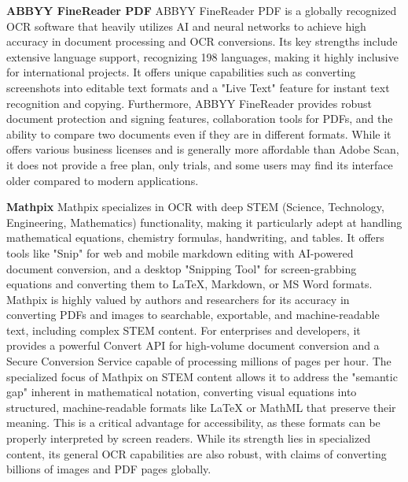 \textbf{ABBYY FineReader PDF}
ABBYY FineReader PDF is a globally recognized OCR software that heavily utilizes AI and neural networks to achieve high accuracy in document processing and OCR conversions. Its key strengths include extensive language support, recognizing 198 languages, making it highly inclusive for international projects. It offers unique capabilities such as converting screenshots into editable text formats and a "Live Text" feature for instant text recognition and copying. Furthermore, ABBYY FineReader provides robust document protection and signing features, collaboration tools for PDFs, and the ability to compare two documents even if they are in different formats. While it offers various business licenses and is generally more affordable than Adobe Scan, it does not provide a free plan, only trials, and some users may find its interface older compared to modern applications.

\textbf{Mathpix}
Mathpix specializes in OCR with deep STEM (Science, Technology, Engineering, Mathematics) functionality, making it particularly adept at handling mathematical equations, chemistry formulas, handwriting, and tables. It offers tools like "Snip" for web and mobile markdown editing with AI-powered document conversion, and a desktop "Snipping Tool" for screen-grabbing equations and converting them to LaTeX, Markdown, or MS Word formats. Mathpix is highly valued by authors and researchers for its accuracy in converting PDFs and images to searchable, exportable, and machine-readable text, including complex STEM content. For enterprises and developers, it provides a powerful Convert API for high-volume document conversion and a Secure Conversion Service capable of processing millions of pages per hour. The specialized focus of Mathpix on STEM content allows it to address the "semantic gap" inherent in mathematical notation, converting visual equations into structured, machine-readable formats like LaTeX or MathML that preserve their meaning. This is a critical advantage for accessibility, as these formats can be properly interpreted by screen readers. While its strength lies in specialized content, its general OCR capabilities are also robust, with claims of converting billions of images and PDF pages globally.

